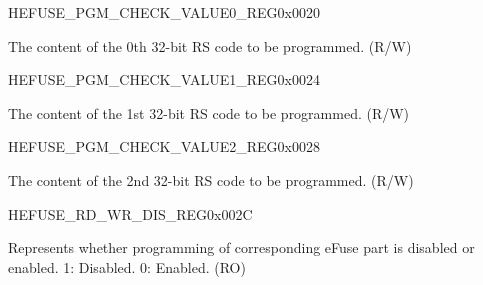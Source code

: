 \begin{register}{H}{EFUSE\_PGM\_CHECK\_VALUE0\_REG}{0x0020}\label{regdesc:EFUSEPGMCHECKVALUE0REG}
%
\regnewline%
\begin{regdesc}\begin{reglist}
\label{fielddesc:EFUSEPGMRSDATA0}\item [EFUSE\_PGM\_RS\_DATA\_0] The content of the 0th 32-bit RS code to be programmed. (R/W)
\end{reglist}\end{regdesc}
\end{register}


\begin{register}{H}{EFUSE\_PGM\_CHECK\_VALUE1\_REG}{0x0024}\label{regdesc:EFUSEPGMCHECKVALUE1REG}
%
\regnewline%
\begin{regdesc}\begin{reglist}
\label{fielddesc:EFUSEPGMRSDATA1}\item [EFUSE\_PGM\_RS\_DATA\_1] The content of the 1st 32-bit RS code to be programmed. (R/W)
\end{reglist}\end{regdesc}
\end{register}


\begin{register}{H}{EFUSE\_PGM\_CHECK\_VALUE2\_REG}{0x0028}\label{regdesc:EFUSEPGMCHECKVALUE2REG}
%
\regnewline%
\begin{regdesc}\begin{reglist}
\label{fielddesc:EFUSEPGMRSDATA2}\item [EFUSE\_PGM\_RS\_DATA\_2] The content of the 2nd 32-bit RS code to be programmed. (R/W)
\end{reglist}\end{regdesc}
\end{register}


\begin{register}{H}{EFUSE\_RD\_WR\_DIS\_REG}{0x002C}\label{regdesc:EFUSERDWRDISREG}
%
\regnewline%
\begin{regdesc}\begin{reglist}
\label{fielddesc:EFUSEWRDIS}\item [EFUSE\_WR\_DIS] Represents whether programming of corresponding eFuse part is disabled or enabled. 1: Disabled. 0: Enabled. (RO)
\end{reglist}\end{regdesc}
\end{register}


